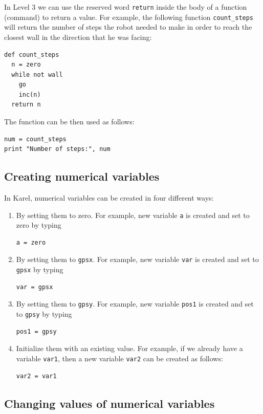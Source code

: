\documentclass[article,A4,12pt]{llncs}
\begin{document}
{{{{In Level 3 we can use the reserved word {\tt return} inside the body of
a function (command) to return a value. For example, the following function 
{\tt count\_steps} will return the number of steps the robot needed to 
make in order to reach the closest wall in the direction that he was facing:

\begin{verbatim}
def count_steps
  n = zero
  while not wall
    go
    inc(n)
  return n
\end{verbatim}
The function can be then used as follows:

\begin{verbatim}
num = count_steps
print "Number of steps:", num 
\end{verbatim}

\subsection{Creating numerical variables}

In Karel, numerical variables can be created in four different ways: 
\begin{enumerate}
\item By setting them to zero. For example, new variable {\tt a} is created and set to zero by typing 
\begin{verbatim}
a = zero
\end{verbatim}
\item By setting them to {\tt gpsx}. For example, new variable {\tt var} is created and set to {\tt gpsx} by typing
\begin{verbatim}
var = gpsx
\end{verbatim}
\item By setting them to {\tt gpsy}. For example, new variable {\tt pos1} is created and set to {\tt gpsy} by typing
\begin{verbatim}
pos1 = gpsy
\end{verbatim}
\item Initialize them with an existing value. For example, if we already have a variable {\tt var1}, then a new variable 
{\tt var2} can be created as follows:
\begin{verbatim}
var2 = var1
\end{verbatim}
\end{enumerate}

\subsection{Changing values of numerical variables}

}}}}
\end{document}
